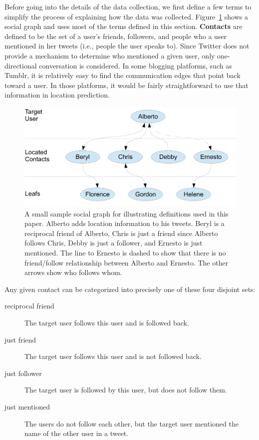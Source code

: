 


Before going into the details of the data collection, we first define a few
terms to simplify the process of explaining how the data was collected.
%
\ifdefined\THESIS
    Figure~\ref{fig:Terms} shows a social graph and uses most of the terms
    defined in this section.
\fi
%
\textbf{Contacts} are defined to be the set of a user's friends, followers, and
people who a user mentioned in her tweets (i.e., people the user speaks to).
%
Since Twitter does not provide a mechanism to determine who mentioned a given
user, only one-directional conversation is considered.
%
In some blogging platforms, such as Tumblr, it is relatively easy to find the
communication edges that point back toward a user.
%
In those platforms, it would be fairly straightforward to use that information
in location prediction.

\ifdefined\THESIS
    \begin{figure}[tbh]
    \centering
    \includegraphics[width=\linewidth]{figures/terms.pdf}
    \caption{
    A small sample social graph for illustrating definitions used in this paper.
    Alberto adds location information to his tweets.
    Beryl is a reciprocal friend of Alberto, Chris is just a friend since Alberto
    follows Chris, Debby is just a follower, and Ernesto is just mentioned.
    The line to Ernesto is dashed to show that there is no friend/follow
    relationship between Alberto and Ernesto.
    The other arrows show who follows whom.
    }
    \label{fig:Terms}
    \end{figure}
\fi

Any given contact can be categorized into precisely one of these four disjoint
sets:
\begin{description}
\item[reciprocal friend] The target user follows this user and is followed
    back.
\item[just friend] The target user follows this user and is not followed
    back.
\item[just follower] The target user is followed by this user, but does
    not follow them.
\item[just mentioned] The users do not follow each other, but the target
    user mentioned the name of the other user in a tweet.
\end{description}

